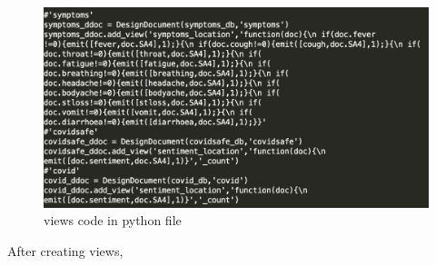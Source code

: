 \begin{figure}[H]
    \centering
    \includegraphics[scale=0.5]{city_analytics/report/images/view.png}
    \caption{views code in python file}
    \label{fig:my_label}
\end{figure}

After creating views, 